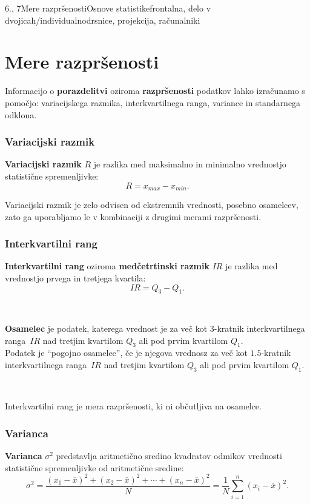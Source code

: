 \begin{priprava}{6., 7}{}{Mere razpršenosti}{Osnove statistike}{frontalna, delo v dvojicah/individualno}{drsnice, projekcija, računalniki}

    \section{Mere razpršenosti}

        

            
    Informacijo o \textbf{porazdelitvi} oziroma \textbf{razpršenosti} podatkov lahko izračunamo s pomočjo: 
    variacijskega razmika, interkvartilnega ranga, variance in standarnega odklona.

\subsubsection{Variacijski razmik}
    \textbf{Variacijski razmik} $R$ je razlika med maksimalno in minimalno vrednostjo statistične spremenljivke:
    $$R=x_{max}-x_{min}.$$



    Variacijski razmik je zelo odvisen od ekstremnih vrednosti, posebno osamelcev, 
    zato ga uporabljamo le v kombinaciji z drugimi merami razpršenosti.





\subsubsection{Interkvartilni rang}
    \textbf{Interkvartilni rang} oziroma \textbf{medčetrtinski razmik} $IR$ je razlika med vrednostjo prvega in tretjega kvartila:
    $$IR=Q_3-Q_1.$$

~

    \textbf{Osamelec} je podatek, katerega vrednost je za več kot $3$-kratnik interkvartilnega ranga~$IR$ nad tretjim kvartilom $Q_3$ ali pod prvim kvartilom $Q_1$. \\
    Podatek je ``pogojno osamelec'', če je njegova vrednosz za več kot $1.5$-kratnik interkvartilnega ranga~$IR$ nad tretjim kvartilom $Q_3$ ali pod prvim kvartilom $Q_1$.


~   

    Interkvartilni rang je mera razpršenosti, ki ni občutljiva na osamelce.





\subsubsection{Varianca}
    \textbf{Varianca} $\sigma^2$ predstavlja aritmetično sredino kvadratov odmikov vrednosti statistične spremenljivke od aritmetične sredine:
    $$\sigma^2=\dfrac{(x_1-\overline{x})^2+(x_2-\overline{x})^2+\cdots+(x_n-\overline{x})^2}{N}=\dfrac{1}{N}\sum_{i=1}^n(x_i-\overline{x})^2.$$



\end{priprava}
